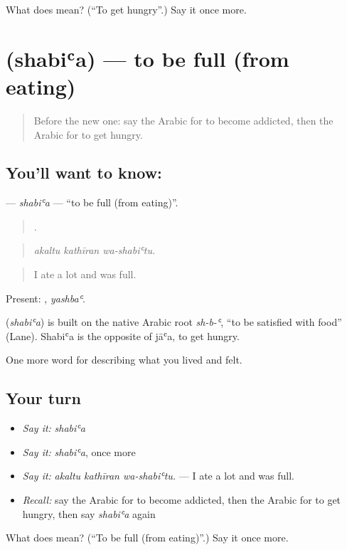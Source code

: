 \begin{tcolorbox}[breakable,colback=teal!4,colframe=teal!35!black,title={Before you move on}]
What does  mean? (\textquotedblleft{}To get hungry\textquotedblright{}.) Say it once more.
\end{tcolorbox}
\section[\texorpdfstring{\ar{شبع} (shabiʿa)}{شبع (shabiʿa)}]{ (shabiʿa) — to be full (from eating)}

\label{lesson:AR-C517-shabia}



\begin{quote}
Before the new one: say the Arabic for to become addicted, then the Arabic for to get hungry.
\end{quote}

\subsection*{You'll want to know: }
\textbf{} — \emph{shabiʿa} — \textquotedblleft{}to be full (from eating)\textquotedblright{}.

\begin{quote}
  .
\end{quote}

\begin{quote}
\emph{akaltu kathīran wa-shabiʿtu.}
\end{quote}

\begin{quote}
I ate a lot and was full.
\end{quote}

Present: , \emph{yashbaʿ}.

\begin{cousinweb}
\textbf{} (\emph{shabiʿa}) is built on the native Arabic root \emph{sh-b-ʿ}, \textquotedblleft{}to be satisfied with food\textquotedblright{} (Lane). Shabiʿa is the opposite of jāʿa, to get hungry.
\end{cousinweb}

\begin{grammarlens}[title={What you've built}]
One more word for describing what you lived and felt.
\end{grammarlens}

\subsection*{Your turn}
\begin{itemize}
\raggedright
  \item \emph{Say it:} \emph{shabiʿa}
  \item \emph{Say it:} \emph{shabiʿa}, once more
  \item \emph{Say it:} \emph{akaltu kathīran wa-shabiʿtu.} — I ate a lot and was full.
  \item \emph{Recall:} say the Arabic for to become addicted, then the Arabic for to get hungry, then say \emph{shabiʿa} again
\end{itemize}

\begin{tcolorbox}[breakable,colback=teal!4,colframe=teal!35!black,title={Before you move on}]
What does  mean? (\textquotedblleft{}To be full (from eating)\textquotedblright{}.) Say it once more.
\end{tcolorbox}
